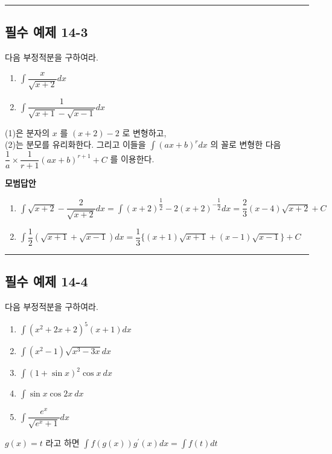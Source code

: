 \documentclass[a4paper,11pt]{article}
\begin{document}
\vspace{0.5cm}
\hrule
\vspace{0.5cm}

\subsection*{필수 예제 14-3}
다음 부정적분을 구하여라.
\begin{enumerate}[label=(\arabic*)]
    \item $\int\dfrac{x}{\sqrt{x+2}}dx$
    \item $\int\dfrac{1}{\sqrt{x+1}-\sqrt{x-1}}dx$
\end{enumerate}

\begin{studybox}
(1)은 분자의 $x$ 를 $(x+2)-2$ 로 변형하고, \\
(2)는 분모를 유리화한다. 그리고 이들을 $\int(ax+b)^{r}dx$ 의 꼴로 변형한 다음\\ $\dfrac{1}{a}\times\dfrac{1}{r+1}(ax+b)^{r+1}+C$ 를 이용한다.
\end{studybox}

\textbf{모범답안}
\begin{enumerate}[label=(\arabic*)]
    \item $\int\sqrt{x+2}-\dfrac{2}{\sqrt{x+2}}dx=\int(x+2)^{\dfrac{1}{2}}-2(x+2)^{-\dfrac{1}{2}}dx=\dfrac{2}{3}(x-4)\sqrt{x+2}+C$
    \item $\int\dfrac{1}{2}(\sqrt{x+1}+\sqrt{x-1})dx=\dfrac{1}{3}\{(x+1)\sqrt{x+1}+(x-1)\sqrt{x-1}\}+C$
\end{enumerate}

\vspace{0.5cm}
\hrule
\vspace{0.5cm}

\subsection*{필수 예제 14-4}
다음 부정적분을 구하여라.
\begin{enumerate}[label=(\arabic*)]
    \item $\int(x^{2}+2x+2)^{5}(x+1)dx$
    \item $\int(x^{2}-1)\sqrt{x^{3}-3x}dx$
    \item $\int(1+\sin x)^{2}\cos x~dx$
    \item $\int\sin x\cos 2x~dx$
    \item $\int\dfrac{e^{x}}{\sqrt{e^{x}+1}}dx$
\end{enumerate}

\begin{studybox}
$g(x)=t$ 라고 하면 $\int f(g(x))g^{\prime}(x)dx=\int f(t)dt$
\end{studybox}
\end{document}
